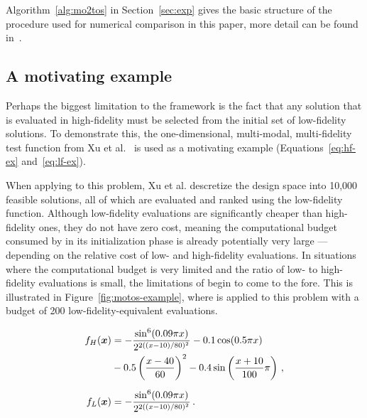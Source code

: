 Algorithm~\ref{alg:mo2tos} in Section~\ref{sec:exp} gives the basic structure of the \motos{} procedure used for numerical comparison in this paper, more detail can be found in~\cite{xu2016mo2tos}.

\subsection{A motivating example}

Perhaps the biggest limitation to the \motos{} framework is the fact that any solution that is evaluated in high-fidelity must be selected from the initial set of low-fidelity solutions. To demonstrate this, the one-dimensional, multi-modal, multi-fidelity test function from Xu et al.~\cite{xu2016mo2tos} is used as a motivating example (Equations~\ref{eq:hf-ex} and~\ref{eq:lf-ex}).

When applying \motos{} to this problem, Xu et al. descretize the design space into 10,000 feasible solutions, all of which are evaluated and ranked using the low-fidelity function. Although low-fidelity evaluations are significantly cheaper than high-fidelity ones, they do not have zero cost, meaning the computational budget consumed by \motos{} in its initialization phase is already potentially very large --- depending on the relative cost of low- and high-fidelity evaluations. In situations where the computational budget is very limited and the ratio of low- to high-fidelity evaluations is small, the limitations of \motos{} begin to come to the fore. This is illustrated in Figure~\ref{fig:motos-example}, where \motos{} is applied to this problem with a budget of 200 low-fidelity-equivalent evaluations.

\begin{align}
f_H(\boldsymbol{x}) &= -\frac{\sin^6(0.09\pi x)}{2^{2((x-10)/80)^2}}-0.1\cos(0.5\pi x)\nonumber\\
           &-0.5\left(\frac{x-40}{60}\right)^2- 0.4\sin\left(\frac{x+10}{100}\pi\right)\,,\label{eq:hf-ex}\\[0.2cm]
f_L(\boldsymbol{x}) &= -\frac{\sin^6(0.09\pi x)}{2^{2((x-10)/80)^2}}\,. \label{eq:lf-ex}
\end{align}

